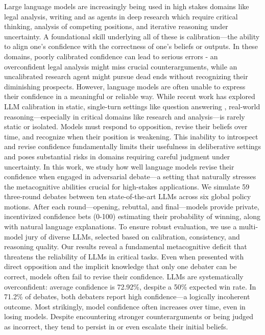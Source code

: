 \documentclass[11pt]{article}
\begin{document}
Large language models are increasingly being used in high stakes domains like legal analysis, writing and as agents in deep research \cite{handa2025economictasksperformedai} \cite{zheng2025deepresearcherscalingdeepresearch} which require critical thinking, analysis of competing positions, and iterative reasoning under uncertainty. A foundational skill underlying all of these is calibration—the ability to align one's confidence with the correctness of one's beliefs or outputs. In these domains, poorly calibrated confidence can lead to serious errors - an overconfident legal analysis might miss crucial counterarguments, while an uncalibrated research agent might pursue dead ends without recognizing their diminishing prospects.
However, language models are often unable to express their confidence in a meaningful or reliable way. While recent work has explored LLM calibration in static, single-turn settings like question answering \citep{tian2023justask, xiong2024uncertainty, kadavath2022know}, real-world reasoning—especially in critical domains like research and analysis—is rarely static or isolated. Models must respond to opposition, revise their beliefs over time, and recognize when their position is weakening. This inability to introspect and revise confidence fundamentally limits their usefulness in deliberative settings and poses substantial risks in domains requiring careful judgment under uncertainty.
In this work, we study how well language models revise their confidence when engaged in adversarial debate—a setting that naturally stresses the metacognitive abilities crucial for high-stakes applications. We simulate 59 three-round debates between ten state-of-the-art LLMs across six global policy motions. After each round—opening, rebuttal, and final—models provide private, incentivized confidence bets (0-100) estimating their probability of winning, along with natural language explanations. To ensure robust evaluation, we use a multi-model jury of diverse LLMs, selected based on calibration, consistency, and reasoning quality.
Our results reveal a fundamental metacognitive deficit that threatens the reliability of LLMs in critical tasks. Even when presented with direct opposition and the implicit knowledge that only one debater can be correct, models often fail to revise their confidence. LLMs are systematically overconfident: average confidence is 72.92\%, despite a 50\% expected win rate. In 71.2\% of debates, both debaters report high confidence—a logically incoherent outcome. Most strikingly, model confidence often increases over time, even in losing models. Despite encountering stronger counterarguments or being judged as incorrect, they tend to persist in or even escalate their initial beliefs.
\end{document}
